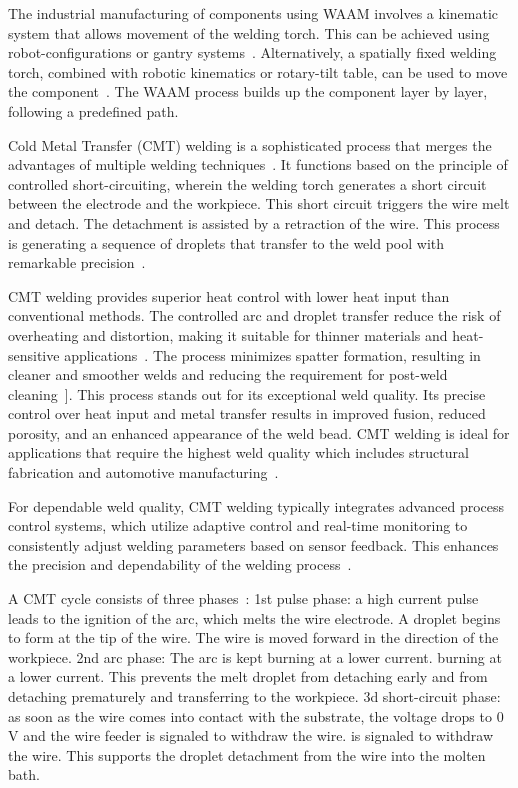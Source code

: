 The industrial manufacturing of components using WAAM involves a kinematic system that allows movement of the welding torch. This can be achieved using robot-configurations or gantry systems~\cite{Schmitz.2021}. Alternatively, a spatially fixed welding torch, combined with robotic kinematics or rotary-tilt table, can be used to move the component~\cite{Nagasai.2022}. The WAAM process builds up the component layer by layer, following a predefined path.

Cold Metal Transfer (CMT) welding is a sophisticated process that merges the advantages of multiple welding techniques~\cite{Dutra.2015}. It functions based on the principle of controlled short-circuiting, wherein the welding torch generates a short circuit between the electrode and the workpiece. This short circuit triggers the wire melt and detach. The detachment is assisted by a retraction of the wire. This process is generating a sequence of droplets that transfer to the weld pool with remarkable precision~\cite{Selvi.2018, Srinivasan.2022}.

CMT welding provides superior heat control with lower heat input than conventional methods. The controlled arc and droplet transfer reduce the risk of overheating and distortion, making it suitable for thinner materials and heat-sensitive applications~\cite{Scotti.2020}. The process minimizes spatter formation, resulting in cleaner and smoother welds and reducing the requirement for post-weld cleaning~\cite{Srinivasan.2022}]. This process stands out for its exceptional weld quality. Its precise control over heat input and metal transfer results in improved fusion, reduced porosity, and an enhanced appearance of the weld bead. CMT welding is ideal for applications that require the highest weld quality which includes structural fabrication and automotive manufacturing~\cite{Cong.2016}.

For dependable weld quality, CMT welding typically integrates advanced process control systems, which utilize adaptive control and real-time monitoring to consistently adjust welding parameters based on sensor feedback. This enhances the precision and dependability of the welding process~\cite{Pickin.2006}.

A CMT cycle consists of three phases~\cite{Selvi.2018}:\newline
1st pulse phase: a high current pulse leads to the ignition of the arc, 
which melts the wire electrode. A droplet begins to form at the 
tip of the wire. The wire is moved forward in the direction of the 
workpiece.\newline
2nd arc phase: The arc is kept burning at a lower current. 
burning at a lower current. This prevents the melt droplet from detaching early and 
from detaching prematurely and transferring to the workpiece.\newline
3d short-circuit phase: as soon as the wire comes into contact with the substrate, 
the voltage drops to 0 V and the wire feeder is signaled to withdraw the wire. 
is signaled to withdraw the wire. This supports the droplet detachment 
from the wire into the molten bath.

